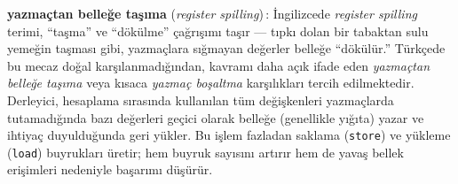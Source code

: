 \begin{terimnotu}
\textbf{yazmaçtan belleğe taşıma} (\emph{register spilling})\,: İngilizcede \emph{register spilling} terimi, ``taşma'' ve ``dökülme'' çağrışımı taşır --- tıpkı dolan bir tabaktan sulu yemeğin taşması gibi, yazmaçlara sığmayan değerler belleğe ``dökülür.'' Türkçede bu mecaz doğal karşılanmadığından, kavramı daha açık ifade eden \emph{yazmaçtan belleğe taşıma} veya kısaca \emph{yazmaç boşaltma} karşılıkları tercih edilmektedir. Derleyici, hesaplama sırasında kullanılan tüm değişkenleri yazmaçlarda tutamadığında bazı değerleri geçici olarak belleğe (genellikle yığıta) yazar ve ihtiyaç duyulduğunda geri yükler. Bu işlem fazladan saklama (\texttt{store}) ve yükleme (\texttt{load}) buyrukları üretir; hem buyruk sayısını artırır hem de yavaş bellek erişimleri nedeniyle başarımı düşürür.
\end{terimnotu}

